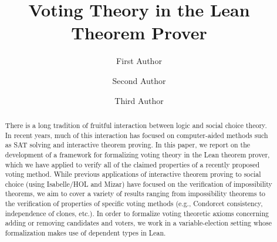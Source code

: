\documentclass[runningheads]{llncs}
\begin{document}
%
\title{Voting Theory in the Lean Theorem Prover}

%
%
\author{First Author \and
Second Author \and
Third Author}
%
%
%
\maketitle              %
%
\begin{abstract}
There is a long tradition of fruitful interaction between logic and social choice theory. In recent years, much of this interaction has focused on computer-aided methods such as SAT solving and interactive theorem proving. In this paper, we report on the development of a framework for formalizing voting theory in the Lean theorem prover, which we have applied to verify all of the claimed properties of a recently proposed voting method. While previous  applications of interactive theorem proving to social choice (using Isabelle/HOL and Mizar) have focused on the verification of impossibility theorems, we aim to cover a variety of results ranging from impossibility theorems to the verification of properties of specific voting methods (e.g., Condorcet consistency, independence of clones, etc.). In order to formalize voting theoretic axioms concerning adding or removing candidates and voters, we work in a variable-election setting whose formalization makes use of dependent types in Lean.



\end{abstract}
%
%
%
\end{document}

